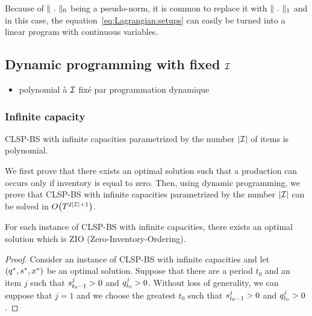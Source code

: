 Because of $\norm{\ .\ }_0$ being a pseudo-norm, it is common to replace it with $\norm{\ .\ }_1$ and in this case, the equation~\eqref{eq:Lagrangian:setups} can easily be turned into a linear program with continuous variables.



\subsection{Dynamic programming with fixed $\mathcal{I}$}


\begin{itemize}
  \item polynomial à $\mathcal{I}$ fixé par programmation dynamique
\end{itemize}


\subsubsection{Infinite capacity}


\begin{thm}
CLSP-BS with infinite capacities parametrized by the number $\card{\REF}$ of items is polynomial.
\end{thm}


We first prove that there exists an optimal solution such that a production can occurs only if inventory is equal to zero.
Then, using dynamic programming, we prove that CLSP-BS with infinite capacities parametrized by the number $\card{\REF}$ can be solved in $O\bracket{\horizon^{2\card{\REF}+1}}$.


\begin{lem}
For each instance of CLSP-BS with infinite capacities, there exists an optimal solution which is ZIO (Zero-Inventory-Ordering).
\end{lem}


\begin{proof}
Consider an instance of CLSP-BS with infinite capacities and let $\bracket{q^*,s^*,x^*}$ be an optimal solution.
Suppose that there are a period $t_0$ and an item $j$ such that $s_{t_0-1}^j>0$ and $q_{t_0}^j>0$.
Without loss of generality, we can suppose that $j=1$ and we choose the greatest $t_0$ such that $s_{t_0-1}^j>0$ and $q_{t_0}^j>0$.
\end{proof}

